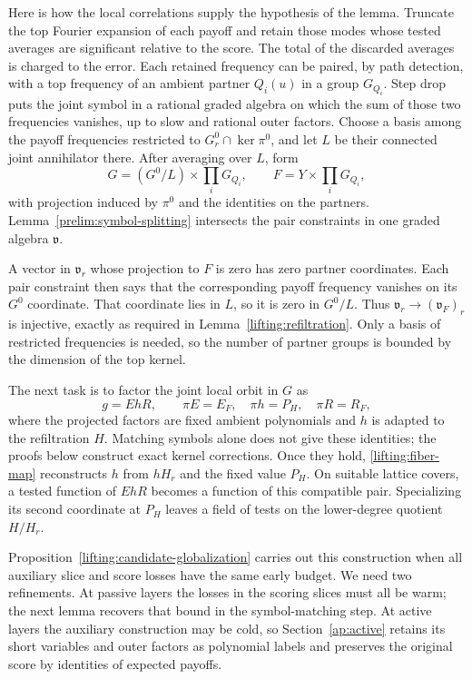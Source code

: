 Here is how the local correlations supply the hypothesis of the lemma.
Truncate the top Fourier expansion of each payoff and retain those
modes whose tested averages are significant relative to the score.
The total of the discarded averages is charged to the error.  Each
retained frequency can be paired, by path detection, with a top
frequency of an ambient partner $Q_i(u)$ in a group $G_{Q_i}$.
Step drop puts the joint symbol in a rational graded algebra on which
the sum of those two frequencies vanishes, up to slow and rational
outer factors.  Choose a basis among the payoff frequencies restricted
to $G^0_r\cap\ker\pi^0$, and let $L$ be their connected joint
annihilator there.  After averaging over $L$, form
\[
 G=(G^0/L)\times\prod_iG_{Q_i},
 \qquad F=Y\times\prod_iG_{Q_i},
\]
with projection induced by $\pi^0$ and the identities on the partners.
Lemma~\ref{prelim:symbol-splitting} intersects the pair constraints in
one graded algebra $\mathfrak v$.

A vector in $\mathfrak v_r$ whose projection to $F$ is zero has
zero partner coordinates.  Each pair constraint then says that the
corresponding payoff frequency vanishes on its $G^0$ coordinate.
That coordinate lies in $L$, so it is zero in $G^0/L$.
Thus $\mathfrak v_r\to(\mathfrak v_F)_r$ is injective, exactly as
required in Lemma~\ref{lifting:refiltration}.  Only a basis of
restricted frequencies is needed, so the number of partner groups is
bounded by the dimension of the top kernel.

The next task is to factor the joint local orbit in $G$ as
\[
 g=EhR,\qquad
 \pi E=E_F,\quad \pi h=P_H,\quad \pi R=R_F,
\]
where the projected factors are fixed ambient polynomials and
$h$ is adapted to the refiltration $H$.  Matching symbols alone
does not give these identities; the proofs below construct exact
kernel corrections.  Once they hold,
\eqref{lifting:fiber-map} reconstructs $h$ from $hH_r$ and the
fixed value $P_H$.  On suitable lattice covers, a tested function
of $EhR$ becomes a function of this compatible pair.  Specializing
its second coordinate at $P_H$ leaves a field of tests on the
lower-degree quotient $H/H_r$.

Proposition~\ref{lifting:candidate-globalization} carries out this
construction when all auxiliary slice and score losses have the same
early budget.  We need two refinements.  At passive layers the losses
in the scoring slices must all be warm; the next lemma recovers that
bound in the symbol-matching step.  At active layers the auxiliary
construction may be cold, so Section~\ref{ap:active} retains its
short variables and outer factors as polynomial labels and preserves
the original score by identities of expected payoffs.

